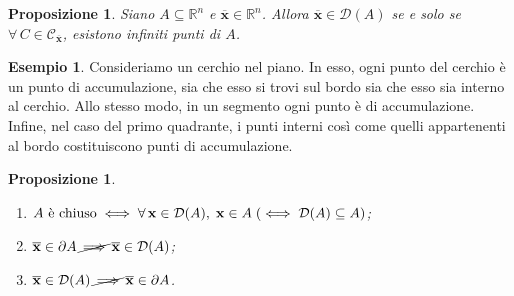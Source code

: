 \documentclass{article}
\theoremstyle{plain}
\newtheorem{prop}[thm]{Proposizione}
\theoremstyle{definition}
\newtheorem{exmp}{Esempio}[section]
\theoremstyle{remark}
\begin{document}
\vspace{10pt}

\begin{bxthm}
\begin{prop}
    Siano $A\subseteq\mathbb{R}^n$ e $\overline{\mathbf{x}}\in\mathbb{R}^n$.
    Allora $\overline{\mathbf{x}}\in\mathcal{D}(A)$ se e solo se $\forall\,C\in\mathcal{C}_{\overline{\mathbf{x}}}$, 
    esistono infiniti punti di $A$.
\end{prop}
\end{bxthm}

\vspace{10pt}

\begin{exmp}
    Consideriamo un cerchio nel piano. In esso, ogni punto del cerchio è un punto di accumulazione, sia che esso si trovi sul bordo sia che esso sia interno al cerchio. 
    Allo stesso modo, in un segmento ogni punto è di accumulazione. 
    Infine, nel caso del primo quadrante, i punti interni così come quelli appartenenti al bordo costituiscono punti di accumulazione.
\end{exmp}

\vspace{10pt}

\begin{bxthm}
\begin{prop}\hfill
    \begin{enumerate}
        \item $A\textup{ è chiuso}\iff\forall\,\mathbf{x}\in\mathcal{D}(A),\;\mathbf{x}\in A\;(\iff\mathcal{D}(A)\subseteq A)$;
        \item $\overline{\mathbf{x}}\in\partial A\,\cancel{\implies}\,\overline{\mathbf{x}}\in\mathcal{D}(A)$;
        \item $\overline{\mathbf{x}}\in\mathcal{D}(A)\,\cancel{\implies}\,\overline{\mathbf{x}}\in\partial A$.
    \end{enumerate}
\end{prop}
\end{bxthm}

\vspace{10pt}
\end{document}
